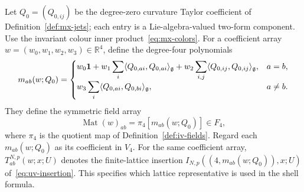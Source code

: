Let $Q_0=(Q_{0,ij})$ be the degree-zero curvature Taylor coefficient of Definition~\ref{def:mx-jets}; each entry is a Lie-algebra-valued two-form component. Use the invariant colour inner product~\eqref{eq:mx-colors}. For a coefficient array $w=(w_0,w_1,w_2,w_3)\in\mathbb R^4$, define the degree-four polynomials
\begin{equation}\label{def:ward-stress-polynomial}
 m_{ab}(w;Q_0)=
 \begin{cases}
 w_0\mathbf1+w_1\displaystyle\sum_i\langle Q_{0,ai},Q_{0,ai}\rangle_{\mathfrak g}
 +w_2\displaystyle\sum_{i,j}\langle Q_{0,ij},Q_{0,ij}\rangle_{\mathfrak g},&a=b,\\[2pt]
 w_3\displaystyle\sum_i\langle Q_{0,ai},Q_{0,bi}\rangle_{\mathfrak g},&a\ne b.
 \end{cases}
\end{equation}
They define the symmetric field array
\begin{equation}\label{def:ward-stress-map}
 \operatorname{Mat}(w)_{ab}=\pi_4[m_{ab}(w;Q_0)]\in F_4,
\end{equation}
where $\pi_4$ is the quotient map of Definition~\ref{def:iv-fields}. Regard each $m_{ab}(w;Q_0)$ as its coefficient in $V_4$. For the same coefficient array, $T_{ab}^{N,p}(w;x;U)$ denotes the finite-lattice insertion $I_{N,p}((4,m_{ab}(w;Q_0)),x;U)$ of~\eqref{eq:uv-insertion}. This specifies which lattice representative is used in the shell formula.

